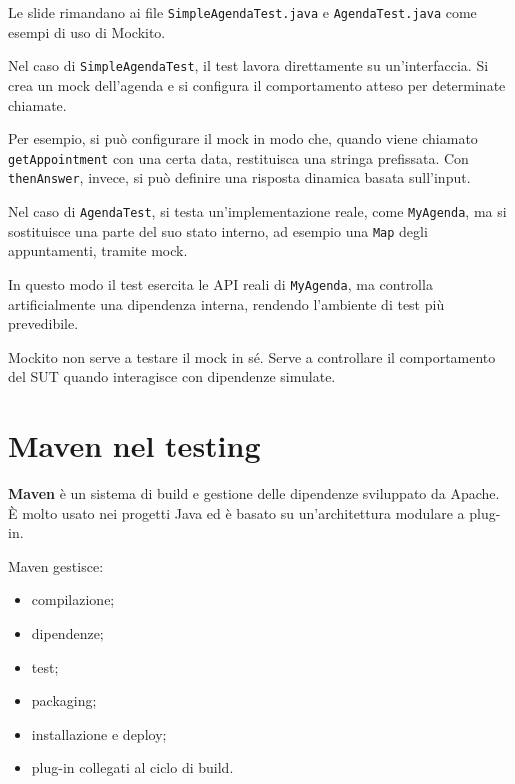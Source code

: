 \begin{notaslide}
Le slide rimandano ai file \texttt{SimpleAgendaTest.java} e \texttt{AgendaTest.java} come esempi di uso di Mockito.
\end{notaslide}

Nel caso di \texttt{SimpleAgendaTest}, il test lavora direttamente su un'interfaccia. Si crea un mock dell'agenda e si configura il comportamento atteso per determinate chiamate.

\begin{notaprof}
Per esempio, si può configurare il mock in modo che, quando viene chiamato \texttt{getAppointment} con una certa data, restituisca una stringa prefissata. Con \texttt{thenAnswer}, invece, si può definire una risposta dinamica basata sull'input.
\end{notaprof}

Nel caso di \texttt{AgendaTest}, si testa un'implementazione reale, come \texttt{MyAgenda}, ma si sostituisce una parte del suo stato interno, ad esempio una \texttt{Map} degli appuntamenti, tramite mock.

\begin{notaprof}
In questo modo il test esercita le API reali di \texttt{MyAgenda}, ma controlla artificialmente una dipendenza interna, rendendo l'ambiente di test più prevedibile.
\end{notaprof}

\begin{notaesame}
Mockito non serve a testare il mock in sé. Serve a controllare il comportamento del SUT quando interagisce con dipendenze simulate.
\end{notaesame}

\section{Maven nel testing}

\textbf{Maven} è un sistema di build e gestione delle dipendenze sviluppato da Apache. È molto usato nei progetti Java ed è basato su un'architettura modulare a plug-in.

Maven gestisce:

\begin{itemize}
    \item compilazione;
    \item dipendenze;
    \item test;
    \item packaging;
    \item installazione e deploy;
    \item plug-in collegati al ciclo di build.
\end{itemize}

